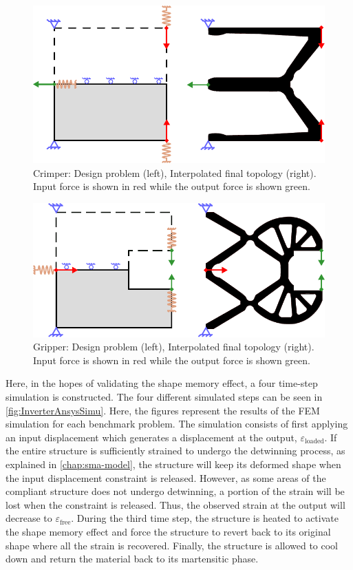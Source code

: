 \begin{figure}[hbt!]
    \centering
    \includegraphics[width=0.65\columnwidth]{images/chap5/Crimper_Schematic_FinalCAD.pdf}
    \caption[Crimper: Design problem (left), Interpolated final topology (right)]{Crimper: Design problem (left), Interpolated final topology (right). Input force is shown in red while the output force is shown green.}
    \label{fig:Crimper_ProbFinal}
\end{figure}
\begin{figure}[hbt!]
    \centering
    \includegraphics[width=0.65\columnwidth]{images/chap5/Gripper_Schematic_FinalCAD.pdf}
    \caption[Gripper: Design problem (left), Interpolated final topology (right)]{Gripper: Design problem (left), Interpolated final topology (right). Input force is shown in red while the output force is shown green.}
    \label{fig:Gripper_ProbFinal}
\end{figure}

Here, in the hopes of validating the shape memory effect, a four time-step simulation is constructed. The four different simulated steps can be seen in \cref{fig:InverterAnsysSimu}. Here, the figures represent the results of the FEM simulation for each benchmark problem. The simulation consists of first applying an input displacement which generates a displacement at the output, $\varepsilon_\text{loaded}$. If the entire structure is sufficiently strained to undergo the detwinning process, as explained in \cref{chap:sma-model}, the structure will keep its deformed shape when the input displacement constraint is released. However, as some areas of the compliant structure does not undergo detwinning, a portion of the strain will be lost when the constraint is released. Thus, the observed strain at the output will decrease to $\varepsilon_\text{free}$. During the third time step, the structure is heated to activate the shape memory effect and force the structure to revert back to its original shape where all the strain is recovered. Finally, the structure is allowed to cool down and return the material back to its martensitic phase.

